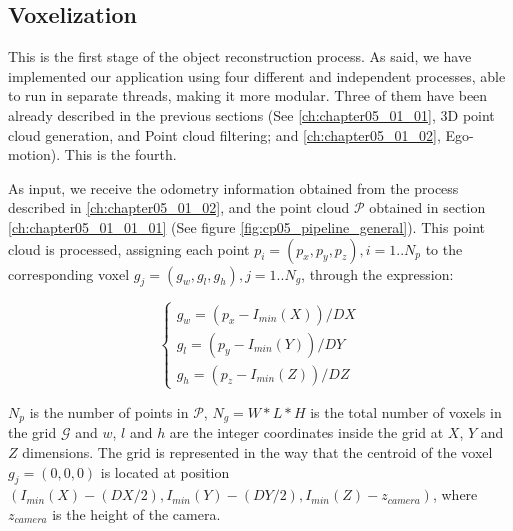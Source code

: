 \subsection{Voxelization}\label{ch:chapter05_01_03}

This is the first stage of the object reconstruction process. As said, we have implemented our application using four different and independent processes, able to run in separate threads, making it more modular. Three of them have been already described in the previous sections (See \ref{ch:chapter05_01_01}, 3D point cloud generation, and Point cloud filtering; and \ref{ch:chapter05_01_02}, Ego-motion). This is the fourth.

As input, we receive the odometry information obtained from the process described in \ref{ch:chapter05_01_02}, and the point cloud $\mathcal{P}$ obtained in section \ref{ch:chapter05_01_01_01} (See figure \ref{fig:cp05_pipeline_general}). This point cloud is processed, assigning each point $p_i = (p_x, p_y, p_z), i=1..N_p$ to the corresponding voxel $g_j=(g_w, g_l, g_h), j=1..N_g$, through the expression:

\begin{equation}\label{eq:cp05_point_to_voxel}
\begin{cases}
g_w = (p_x - I_{min}(X)) / DX\\
g_l = (p_y - I_{min}(Y)) / DY\\
g_h = (p_z - I_{min}(Z)) / DZ
\end{cases}
\end{equation}

$N_p$ is the number of points in $\mathcal{P}$, $N_g = W * L * H$ is the total number of voxels in the grid $\mathcal{G}$ and $w$, $l$ and $h$ are the integer coordinates inside the grid at $X$, $Y$ and $Z$ dimensions. The grid is represented in the way that the centroid of the voxel $g_j=(0,0,0)$ is located at position $(I_{min}(X) - (DX/2), I_{min}(Y) - (DY/2), I_{min}(Z) - z_{camera})$, where $z_{camera}$ is the height of the camera.

